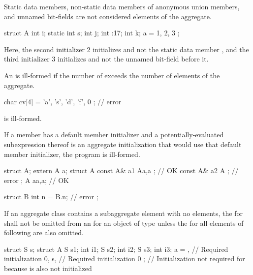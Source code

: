 \pnum
\begin{note}
Static data members,
non-static data members of anonymous union members,
and
unnamed bit-fields
are not considered elements of the aggregate.
\begin{example}

\begin{codeblock}
struct A {
  int i;
  static int s;
  int j;
  int :17;
  int k;
} a = { 1, 2, 3 };
\end{codeblock}

Here, the second initializer 2 initializes
and not the static data member
, and the third initializer 3 initializes 
and not the unnamed bit-field before it.
\end{example}
\end{note}

\pnum
An
is ill-formed if the number of
exceeds the number of elements of the aggregate.
\begin{example}

\begin{codeblock}
char cv[4] = { 'a', 's', 'd', 'f', 0 };     // error
\end{codeblock}

is ill-formed.
\end{example}

\pnum
If a member has a default member initializer
and a potentially-evaluated subexpression thereof is an aggregate
initialization that would use that default member initializer,
the program is ill-formed.
\begin{example}
\begin{codeblock}
  struct A;
  extern A a;
  struct A {
    const A& a1 { A{a,a} };     // OK
    const A& a2 { A{} };        // error
  };
  A a{a,a};                     // OK

  struct B {
    int n = B{}.n;              // error
  };
\end{codeblock}
\end{example}

\pnum
If an aggregate class  contains a subaggregate element
 with no elements,
the  for  shall not be
omitted from an  for an object of type
 unless the  for all
elements of  following  are also omitted.
\begin{example}
\begin{codeblock}
struct S { } s;
struct A {
  S s1;
  int i1;
  S s2;
  int i2;
  S s3;
  int i3;
} a = {
  { },              // Required initialization
  0,
  s,                // Required initialization
  0
};                  // Initialization not required for  because  is also not initialized
\end{codeblock}
\end{example}

